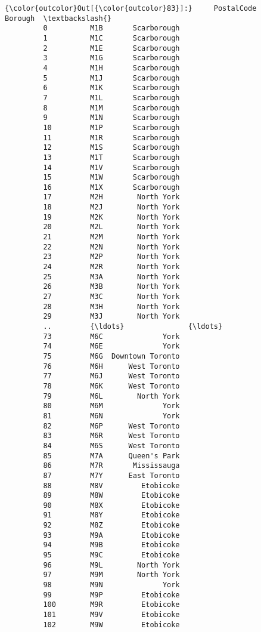 \documentclass[11pt]{article}
\begin{document}
\begin{Verbatim}[commandchars=\\\{\}]
{\color{outcolor}Out[{\color{outcolor}83}]:}     PostalCode           Borough  \textbackslash{}
         0          M1B       Scarborough   
         1          M1C       Scarborough   
         2          M1E       Scarborough   
         3          M1G       Scarborough   
         4          M1H       Scarborough   
         5          M1J       Scarborough   
         6          M1K       Scarborough   
         7          M1L       Scarborough   
         8          M1M       Scarborough   
         9          M1N       Scarborough   
         10         M1P       Scarborough   
         11         M1R       Scarborough   
         12         M1S       Scarborough   
         13         M1T       Scarborough   
         14         M1V       Scarborough   
         15         M1W       Scarborough   
         16         M1X       Scarborough   
         17         M2H        North York   
         18         M2J        North York   
         19         M2K        North York   
         20         M2L        North York   
         21         M2M        North York   
         22         M2N        North York   
         23         M2P        North York   
         24         M2R        North York   
         25         M3A        North York   
         26         M3B        North York   
         27         M3C        North York   
         28         M3H        North York   
         29         M3J        North York   
         ..         {\ldots}               {\ldots}   
         73         M6C              York   
         74         M6E              York   
         75         M6G  Downtown Toronto   
         76         M6H      West Toronto   
         77         M6J      West Toronto   
         78         M6K      West Toronto   
         79         M6L        North York   
         80         M6M              York   
         81         M6N              York   
         82         M6P      West Toronto   
         83         M6R      West Toronto   
         84         M6S      West Toronto   
         85         M7A      Queen's Park   
         86         M7R       Mississauga   
         87         M7Y      East Toronto   
         88         M8V         Etobicoke   
         89         M8W         Etobicoke   
         90         M8X         Etobicoke   
         91         M8Y         Etobicoke   
         92         M8Z         Etobicoke   
         93         M9A         Etobicoke   
         94         M9B         Etobicoke   
         95         M9C         Etobicoke   
         96         M9L        North York   
         97         M9M        North York   
         98         M9N              York   
         99         M9P         Etobicoke   
         100        M9R         Etobicoke   
         101        M9V         Etobicoke   
         102        M9W         Etobicoke   
         

\end{Verbatim}
\end{document}
